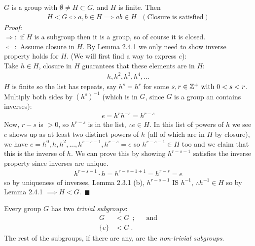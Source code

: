 \begin{lemma}
$G$ is a group with $\emptyset\neq H\subset G$, and $H$ is finite. Then
\begin{align}
    H<G \iff a,b\in H \implies ab\in H \ \ \ (\text{Closure is satisfied})\nonumber
\end{align}
\textit{Proof:}\\
$\Rightarrow :$ if $H$ is a subgroup then it is a group, so of course it is closed.\\
$\Leftarrow :$ Assume closure in $H$. By Lemma 2.4.1 we only need to show inverse property holds for
$H$. (We will first find a way to express $e$):\\
\noindent Take $h\in H$, closure in $H$ guarantees that these elements are in $H$:
\begin{align}
    h,h^2,h^3,h^4,...\nonumber
\end{align}
$H$ is finite so the list has repeats, say $h^s=h^r$ for some $s,r\in {\mathbb{Z}}^+ \text{ with } 0<s<r$.
Multiply both sides by $(h^s)^{-1}$ (which is in $G$, since $G$ is a group an contains inverses):
\begin{align}
    e=h^rh^{-s}=h^{r-s} \nonumber
\end{align}
Now, $r-s$ is $>0$, so $h^{r-s}$ is in the list, $\therefore e\in H$. In this list of powers of $h$
we see $e$ shows up as at least two distinct powers of $h$ (all of which are in $H$ by closure), we
have $e=h^0,h,h^2,...,h^{r-s-1},h^{r-s}=e$ so $h^{r-s-1}\in H$ too and we claim that this is the
inverse of $h$. We can prove this by showing $h^{r-s-1}$ satisfies the inverse property since
inverses are unique.
\begin{align}
    h^{r-s-1}\cdot h= h^{r-s-1+1}=h^{r-s}=e \nonumber
\end{align}
so by uniqueness of inverses, Lemma 2.3.1 (b), $h^{r-s-1}$ IS $h^{-1}$, $\therefore h^{-1}\in H$ so
by Lemma 2.4.1 $\implies H<G. \ \ \blacksquare$
\end{lemma}

\begin{example}
Every group $G$ has two \textit{trivial subgroups}:
\begin{align}
    G&<G   \ \ ; \ \ \ \ \ \ \ \text{and} \nonumber\\
    \{e\}&<G \ . \nonumber
\end{align}
The rest of the subgroups, if there are any, are the \textit{non-trivial subgroups}.
\end{example}

